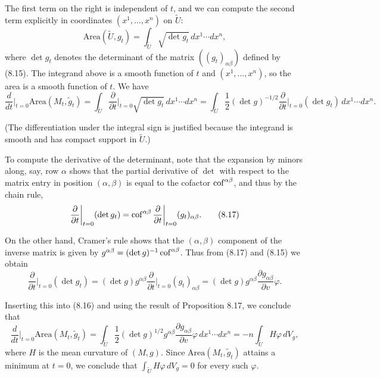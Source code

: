 The first term on the right is independent of $t$, and we can compute the second term explicitly in coordinates $(x^1,\ldots,x^n)$ on $\tilde{U}$:
\[
\text{Area}(\tilde{U}, g_t) = \int_{\tilde{U}} \sqrt{\det g_t} \, dx^1 \cdots dx^n,
\]
where $\det g_t$ denotes the determinant of the matrix $((g_t)_{\alpha\beta})$ defined by (8.15). The integrand above is a smooth function of $t$ and $(x^1,\ldots,x^n)$, so the area is a smooth function of $t$. We have
\begin{equation}
\frac{d}{dt}\bigg|_{t=0} \text{Area}(M_t, \tilde{g}_t) = \int_{\tilde{U}} \frac{\partial}{\partial t}\bigg|_{t=0} \sqrt{\det g_t} \, dx^1 \cdots dx^n
= \int_{\tilde{U}} \frac{1}{2}(\det g)^{-1/2} \frac{\partial}{\partial t}\bigg|_{t=0} (\det g_t) \, dx^1 \cdots dx^n.
\tag{8.16}
\end{equation}

(The differentiation under the integral sign is justified because the integrand is smooth and has compact support in $\tilde{U}$.)

To compute the derivative of the determinant, note that the expansion by minors along, say, row $\alpha$ shows that the partial derivative of $\det$ with respect to the matrix entry in position $(\alpha,\beta)$ is equal to the cofactor $\operatorname{cof}^{\alpha\beta}$, and thus by the chain rule,
\begin{equation}
\frac{\partial}{\partial t}\bigg|_{t=0} (\det g_t) = \operatorname{cof}^{\alpha\beta} \frac{\partial}{\partial t}\bigg|_{t=0} (g_t)_{\alpha\beta}.
\tag{8.17}
\end{equation}

On the other hand, Cramer's rule shows that the $(\alpha,\beta)$ component of the inverse matrix is given by $g^{\alpha\beta} = (\det g)^{-1}\operatorname{cof}^{\alpha\beta}$. Thus from (8.17) and (8.15) we obtain
\[
\frac{\partial}{\partial t}\bigg|_{t=0} (\det g_t) = (\det g)g^{\alpha\beta} \frac{\partial}{\partial t}\bigg|_{t=0} (g_t)_{\alpha\beta} = (\det g)g^{\alpha\beta} \frac{\partial g_{\alpha\beta}}{\partial v} \varphi.
\]

Inserting this into (8.16) and using the result of Proposition 8.17, we conclude that
\begin{equation}
\frac{d}{dt}\bigg|_{t=0} \text{Area}(M_t, \tilde{g}_t) = \int_{\tilde{U}} \frac{1}{2}(\det g)^{1/2} g^{\alpha\beta} \frac{\partial g_{\alpha\beta}}{\partial v} \varphi \, dx^1 \cdots dx^n
= -n \int_{\tilde{U}} H\varphi \, dV_g,
\tag{8.18}
\end{equation}
where $H$ is the mean curvature of $(M,g)$. Since $\text{Area}(M_t, \tilde{g}_t)$ attains a minimum at $t=0$, we conclude that $\int_{\tilde{U}} H\varphi \, dV_g = 0$ for every such $\varphi$.

